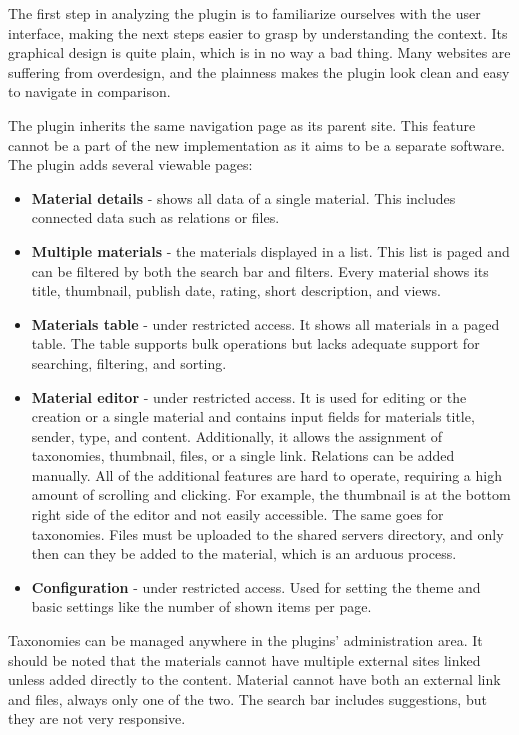 \documentclass[
  digital,     %
  oneside,     %
  nosansbold,  %
  colorbold, %
  lof,         %
  lot,         %
]{fithesis4}
\begin{document}
The first step in analyzing the plugin is to familiarize ourselves with the user interface,
making the next steps easier to grasp by understanding the context. Its graphical design
is quite plain, which is in no way a bad thing. Many websites are suffering from overdesign,
and the plainness makes the plugin look clean and easy to navigate in comparison.

The plugin inherits the same navigation page as its parent site. This feature cannot be a part
of the new implementation as it aims to be a separate software. The plugin adds several 
viewable pages:

\begin{itemize}
	\item \textbf{Material details} - shows all data of a single material. This includes connected
	data such as relations or files.
	\item \textbf{Multiple materials} - the materials displayed in a list. This list is paged and can
	be filtered by both the search bar and filters. Every material shows its title, thumbnail, publish
	date, rating, short description, and views. 
	\item \textbf{Materials table} - under restricted access. It shows all materials in a paged table.
	The table supports bulk operations but lacks adequate support for searching, filtering, and sorting.
	\item \textbf{Material editor} - under restricted access. It is used for editing or the creation or
	a single material and contains input fields for materials title, sender, type, and content. Additionally,
	it allows the assignment of taxonomies, thumbnail, files, or a single link. Relations can be added
	manually. All of the additional features are hard to operate, requiring a high amount of scrolling
	and clicking. For example, the thumbnail is at the bottom right side of the editor and not easily
	accessible. The same goes for taxonomies. Files must be uploaded to the shared servers directory,
	and only then can they be added to the material, which is an arduous process.
	\item \textbf{Configuration} - under restricted access. Used for setting the theme and basic
	settings like the number of shown items per page.
\end{itemize}

Taxonomies can be managed anywhere in the plugins' administration area. It should be noted
that the materials cannot have multiple external sites linked unless added directly to the content.
Material cannot have both an external link and files, always only one of the two. The search bar
includes suggestions, but they are not very responsive.
\end{document}

